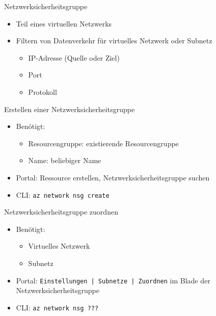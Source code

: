 
\begin{flashcard}[Definition]{Netzwerksicherheitsgruppe}
    \begin{itemize}
        \item Teil eines virtuellen Netzwerks
        \item Filtern von Datenverkehr für virtuelles Netzwerk oder Subnetz
        \begin{itemize}
            \item IP-Adresse (Quelle oder Ziel)
            \item Port
            \item Protokoll
        \end{itemize}
    \end{itemize}
\end{flashcard}

\begin{flashcard}[Definition]{Erstellen einer Netzwerksicherheitsgruppe}
    \begin{itemize}
        \item Benötigt:
            \begin{itemize}
                \item Resourcengruppe: existierende Resourcengruppe
                \item Name: beliebiger Name
            \end{itemize}
        \item Portal: Ressource erstellen, Netzwerksicherheitsgruppe suchen
        \item CLI: \texttt{az network nsg create}
    \end{itemize}
\end{flashcard}

\begin{flashcard}[Definition]{Netzwerksicherheitsgruppe zuordnen}
    \begin{itemize}
        \item Benötigt:
            \begin{itemize}
                \item Virtuelles Netzwerk
                \item Subnetz
            \end{itemize}
        \item Portal: \texttt{Einstellungen | Subnetze | Zuordnen} im Blade der Netzwerksicherheitsgruppe
        \item CLI: \texttt{az network nsg ???}
    \end{itemize}
\end{flashcard}

